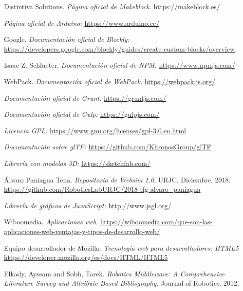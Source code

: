 \begin{thebibliography}{99}
    Distintiva Solutions.
    \textit{Página oficial de Makeblock.}
    \url{https://makeblock.es/}
    
    \textit{Página oficial de Arduino:}
    \url{https://www.arduino.cc/}
    
    Google.
    \textit{Documentación oficial de Blockly:}
    \url{https://developers.google.com/blockly/guides/create-custom-blocks/overview}
    
    Isaac Z. Schlueter.
    \textit{Documentación oficial de NPM.}
    \url{https://www.npmjs.com/}
    
    WebPack. 
    \textit{Documentación oficial de WebPack.}
    \url{https://webpack.js.org/}
    
    \textit{Documentación oficial de Grunt:}
    \url{https://gruntjs.com/}
    
    \textit{Documentación oficial de Gulp:}
    \url{https://gulpjs.com/}
    
    \textit{Licencia GPL:}
    \url{https://www.gnu.org/licenses/gpl-3.0.en.html}
    
    \textit{Documentación sobre glTF:}
    \url{https://github.com/KhronosGroup/glTF}
    
    \textit{Librería con modelos 3D:}
    \url{https://sketchfab.com/}
    
    Álvaro Paniagua Tena.
    \textit{Repositorio de Websim 1.0}. URJC. Diciembre, 2018.
    \url{https://github.com/RoboticsLabURJC/2018-tfg-alvaro_paniagua}
    
    \textit{Librería de gráficos de JavaScript:}
    \url{http://www.jsgl.org/}
    
    Wiboomedia.
    \textit{Aplicaciones web.}
    \url{https://wiboomedia.com/que-son-las-aplicaciones-web-ventajas-y-tipos-de-desarrollo-web/}

    Equipo desarrollador de Mozilla.
    \textit{Tecnología web para desarrolladores: HTML5}   \url{https://developer.mozilla.org/es/docs/HTML/HTML5}
     
    Elkady, Ayssam and Sobh, Tarek. 
    \textit{Robotics Middleware: A Comprehensive Literature Survey and Attribute-Based Bibliography.} Journal of Robotics. 2012.  
    

\end{thebibliography}
